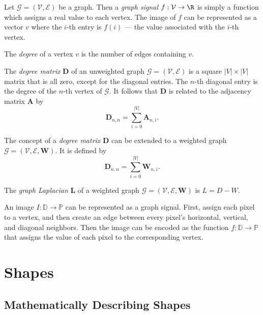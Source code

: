 \documentclass[12pt]{article}
\begin{document}
\begin{defn}
    Let $\mathcal{G} = (\mathcal{V}, \mathcal{E})$ be a graph. Then a \emph{graph signal} $f: \mathcal{V} \to \R$ is simply a function which assigns a real value to each vertex. The image of $f$ can be represented as a vector $v$ where the $i$-th entry is $f(i)$ --- the value associated with the $i$-th vertex.
\end{defn}

\begin{defn}
    The \emph{degree} of a vertex $v$ is the number of edges containing $v$.
\end{defn}

\begin{defn}
    The \emph{degree matrix} $\bm{D}$ of an unweighted graph $\mathcal{G} = (\mathcal{V}, \mathcal{E})$ is a square $|V| \times |V|$ matrix that is all zero, except for the diagonal entries. The $n$-th diagonal entry is the degree of the $n$-th vertex of $\mathcal{G}$. It follows that $\bm{D}$ is related to the adjacency matrix $\bm{A}$ by \[\bm{D}_{n,n} = \sum_{i=0}^{|V|}\bm{A}_{n,i}.\]
\end{defn}

\begin{defn}
    The concept of a \emph{degree matrix} $\bm{D}$ can be extended to a weighted graph $\mathcal{G} = (\mathcal{V}, \mathcal{E}, \bm{W})$. It is defined by \[\bm{D}_{n,n} = \sum_{i=0}^{|V|}\bm{W}_{n,i}.\]
\end{defn}

\begin{defn}
    The \emph{graph Laplacian} $\bm{L}$ of a weighted graph $\mathcal{G} = (\mathcal{V}, \mathcal{E}, \bm{W})$ is $L = D - W$.
\end{defn}

An image $I: \mathbb{D} \to \mathbb{P}$ can be represented as a graph signal. First, assign each pixel to a vertex, and then create an edge between every pixel's horizontal, vertical, and diagonal neighbors. Then the image can be encoded as the function $f: \mathbb{D} \to \mathbb{P}$ that assigns the value of each pixel to the corresponding vertex.

\section{Shapes}

\subsection{Mathematically Describing Shapes}
\end{document}
